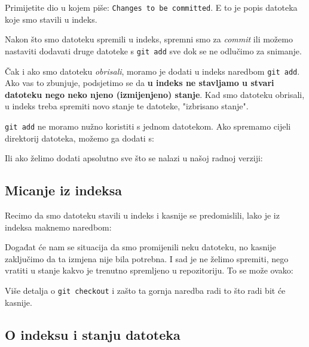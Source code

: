 

Primijetite dio u kojem piše: \verb+Changes to be committed+. E to je popis datoteka koje smo stavili u indeks.

Nakon što smo datoteku spremili u indeks, spremni smo za \emph{commit} ili možemo nastaviti dodavati druge datoteke s \verb+git add+ sve dok se ne odlučimo za snimanje.

Čak i ako smo datoteku \emph{obrisali}, moramo je dodati u indeks naredbom \verb+git add+.
Ako vas to zbunjuje, podsjetimo se da \textbf{u indeks ne stavljamo u stvari datoteku nego neko njeno (izmijenjeno) stanje}.
Kad smo datoteku obrisali, u indeks treba spremiti novo stanje te datoteke, "izbrisano stanje".

\verb+git add+ ne moramo nužno koristiti s jednom datotekom.
Ako spremamo cijeli direktorij datoteka, možemo ga dodati s:


Ili ako želimo dodati apsolutno sve što se nalazi u našoj radnoj verziji:


\subsection*{Micanje iz indeksa}

Recimo da smo datoteku stavili u indeks i kasnije se predomislili, lako je iz indeksa maknemo naredbom:


Događat će nam se situacija da smo promijenili neku datoteku, no kasnije zaključimo da ta izmjena nije bila potrebna. 
I sad je ne želimo spremiti, nego vratiti u stanje kakvo je trenutno spremljeno u repozitoriju.
To se može ovako:


Više detalja o \verb+git checkout+ i zašto ta gornja naredba radi to što radi bit će kasnije.

\subsection*{O indeksu i stanju datoteka}

